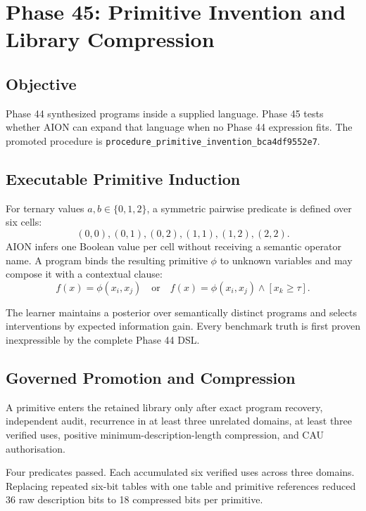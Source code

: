 \section{Phase 45: Primitive Invention and Library Compression}
\label{sec:hexcore-phase45}

\subsection{Objective}

Phase 44 synthesized programs inside a supplied language. Phase 45 tests
whether AION can expand that language when no Phase 44 expression fits. The
promoted procedure is
\nolinkurl{procedure_primitive_invention_bca4df9552e7}.

\subsection{Executable Primitive Induction}

For ternary values $a,b\in\{0,1,2\}$, a symmetric pairwise predicate is
defined over six cells:
\begin{equation}
  (0,0),(0,1),(0,2),(1,1),(1,2),(2,2).
\end{equation}
AION infers one Boolean value per cell without receiving a semantic operator
name. A program binds the resulting primitive $\phi$ to unknown variables and
may compose it with a contextual clause:
\begin{equation}
  f(x)=\phi(x_i,x_j)
  \quad\mathrm{or}\quad
  f(x)=\phi(x_i,x_j)\land[x_k\geq\tau].
\end{equation}

The learner maintains a posterior over semantically distinct programs and
selects interventions by expected information gain. Every benchmark truth is
first proven inexpressible by the complete Phase 44 DSL.

\subsection{Governed Promotion and Compression}

A primitive enters the retained library only after exact program recovery,
independent audit, recurrence in at least three unrelated domains, at least
three verified uses, positive minimum-description-length compression, and CAU
authorisation.

Four predicates passed. Each accumulated six verified uses across three
domains. Replacing repeated six-bit tables with one table and primitive
references reduced 36 raw description bits to 18 compressed bits per
primitive.

